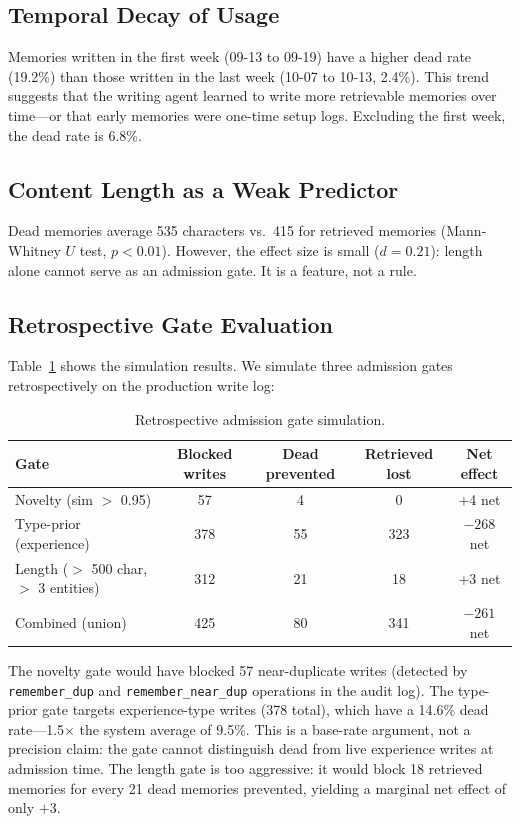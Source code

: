 \documentclass[10pt,twocolumn]{article}
\begin{document}
\subsection{Temporal Decay of Usage}

Memories written in the first week (09-13 to 09-19) have a higher dead rate (19.2\%) than those written in the last week (10-07 to 10-13, 2.4\%). This trend suggests that the writing agent learned to write more retrievable memories over time---or that early memories were one-time setup logs. Excluding the first week, the dead rate is 6.8\%.

\subsection{Content Length as a Weak Predictor}

Dead memories average 535 characters vs.\ 415 for retrieved memories (Mann-Whitney $U$ test, $p < 0.01$). However, the effect size is small ($d = 0.21$): length alone cannot serve as an admission gate. It is a feature, not a rule.

\subsection{Retrospective Gate Evaluation}

Table~\ref{tab:gates} shows the simulation results. We simulate three admission gates retrospectively on the production write log:

\begin{table}[h]
\centering
\caption{Retrospective admission gate simulation.}
\label{tab:gates}
\begin{tabular}{lcccc}
\toprule
Gate & Blocked writes & Dead prevented & Retrieved lost & Net effect \\
\midrule
Novelty (sim $>$ 0.95) & 57 & 4 & 0 & +4 net \\
Type-prior (experience) & 378 & 55 & 323 & $-268$ net \\
Length ($>$ 500 char, $>$ 3 entities) & 312 & 21 & 18 & +3 net \\
\midrule
Combined (union) & 425 & 80 & 341 & $-261$ net \\
\bottomrule
\end{tabular}
\end{table}

The novelty gate would have blocked 57 near-duplicate writes (detected by \texttt{remember\_dup} and \texttt{remember\_near\_dup} operations in the audit log). The type-prior gate targets experience-type writes (378 total), which have a 14.6\% dead rate---1.5$\times$ the system average of 9.5\%. This is a base-rate argument, not a precision claim: the gate cannot distinguish dead from live experience writes at admission time. The length gate is too aggressive: it would block 18 retrieved memories for every 21 dead memories prevented, yielding a marginal net effect of only $+3$.
\end{document}
